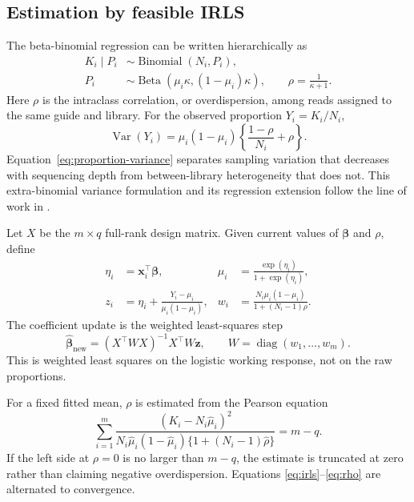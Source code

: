 \subsection{Estimation by feasible IRLS}

The beta-binomial regression can be written hierarchically as
\begin{align}
  K_i\mid P_i &\sim \operatorname{Binomial}(N_i,P_i),\\
  P_i &\sim \operatorname{Beta}(\mu_i\kappa,(1-\mu_i)\kappa),
  \qquad \rho=\frac{1}{\kappa+1}.
\end{align}
Here $\rho$ is the intraclass correlation, or overdispersion, among reads
assigned to the same guide and library.  For the observed proportion
$Y_i=K_i/N_i$,
\begin{equation}
  \operatorname{Var}(Y_i)
  =\mu_i(1-\mu_i)
   \left\{\frac{1-\rho}{N_i}+\rho\right\}.
  \label{eq:proportion-variance}
\end{equation}
Equation~\eqref{eq:proportion-variance} separates sampling variation that
decreases with sequencing depth from between-library heterogeneity that does
not.  This extra-binomial variance formulation and its regression extension
follow the line of work in \citet{williams1982extrabinomial,
baggerly2003differential,baggerly2004overdispersed}.

Let $X$ be the $m\times q$ full-rank design matrix.  Given current values of
$\boldsymbol{\beta}$ and $\rho$, define
\begin{align}
  \eta_i &= \mathbf{x}_i^\top\boldsymbol{\beta}, &
  \mu_i &= \frac{\exp(\eta_i)}{1+\exp(\eta_i)},\\
  z_i &= \eta_i+\frac{Y_i-\mu_i}{\mu_i(1-\mu_i)}, &
  w_i &= \frac{N_i\mu_i(1-\mu_i)}
  {1+(N_i-1)\rho}. \label{eq:irls}
\end{align}
The coefficient update is the weighted least-squares step
\begin{equation}
  \widehat{\boldsymbol{\beta}}_{\mathrm{new}}
  =(X^\top W X)^{-1}X^\top W\mathbf{z},
  \qquad W=\operatorname{diag}(w_1,\ldots,w_m).
  \label{eq:betaupdate}
\end{equation}
This is weighted least squares on the logistic working response, not on the raw
proportions.

For a fixed fitted mean, $\rho$ is estimated from the Pearson equation
\begin{equation}
  \sum_{i=1}^{m}
  \frac{(K_i-N_i\widehat{\mu}_i)^2}
  {N_i\widehat{\mu}_i(1-\widehat{\mu}_i)
  \{1+(N_i-1)\widehat{\rho}\}}
  =m-q. \label{eq:rho}
\end{equation}
If the left side at $\rho=0$ is no larger than $m-q$, the estimate is truncated
at zero rather than claiming negative overdispersion.  Equations
\eqref{eq:irls}--\eqref{eq:rho} are alternated to convergence.

